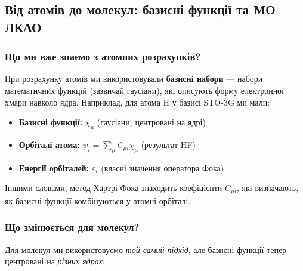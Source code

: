 
\subsection{Від атомів до молекул: базисні функції та МО ЛКАО}

\subsubsection{Що ми вже знаємо з атомних розрахунків?}

При розрахунку атомів ми використовували \textbf{базисні набори} --- набори математичних функцій (зазвичай гаусіани), які описують форму електронної хмари навколо ядра. Наприклад, для атома H у базисі STO-3G ми мали:

\begin{itemize}
	\item \textbf{Базисні функції:} $\chi_\mu$ (гаусіани, центровані на ядрі)
	\item \textbf{Орбіталі атома:} $\psi_i = \sum_\mu C_{\mu i} \chi_\mu$ (результат HF)
	\item \textbf{Енергії орбіталей:} $\varepsilon_i$ (власні значення оператора Фока)
\end{itemize}

Іншими словами, метод Хартрі-Фока знаходить коефіцієнти $C_{\mu i}$, які визначають, як базисні функції комбінуються у атомні орбіталі.

\subsubsection{Що змінюється для молекул?}

Для молекул ми використовуємо \emph{той самий підхід}, але базисні функції тепер центровані на \emph{різних ядрах}:

